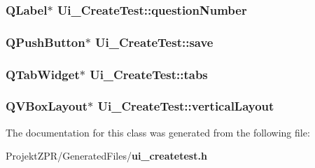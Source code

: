 \subsubsection[{question\-Number}]{\setlength{\rightskip}{0pt plus 5cm}Q\-Label$\ast$ Ui\-\_\-\-Create\-Test\-::question\-Number}\label{class_ui___create_test_af573efa4d3b727e22527d6dde8f9ec6d}
\subsubsection[{save}]{\setlength{\rightskip}{0pt plus 5cm}Q\-Push\-Button$\ast$ Ui\-\_\-\-Create\-Test\-::save}\label{class_ui___create_test_abf31131d498238ccb33becacd33b030e}
\subsubsection[{tabs}]{\setlength{\rightskip}{0pt plus 5cm}Q\-Tab\-Widget$\ast$ Ui\-\_\-\-Create\-Test\-::tabs}\label{class_ui___create_test_a6609ab60c2e694421e2e565b5efca279}
\subsubsection[{vertical\-Layout}]{\setlength{\rightskip}{0pt plus 5cm}Q\-V\-Box\-Layout$\ast$ Ui\-\_\-\-Create\-Test\-::vertical\-Layout}\label{class_ui___create_test_a8835814d462706502c89dcaaf03fa99a}


The documentation for this class was generated from the following file\-:\begin{DoxyCompactItemize}
\item 
Projekt\-Z\-P\-R/\-Generated\-Files/{\bf ui\-\_\-createtest.\-h}\end{DoxyCompactItemize}

